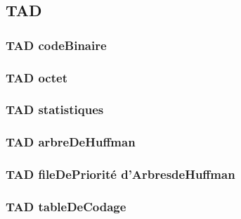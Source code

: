 \subsection{TAD}

\subsubsection{TAD codeBinaire}


\subsubsection{TAD octet}


\subsubsection{TAD statistiques}


\subsubsection{TAD arbreDeHuffman}


\subsubsection{TAD fileDePriorité d'ArbresdeHuffman}


\subsubsection{TAD tableDeCodage}

